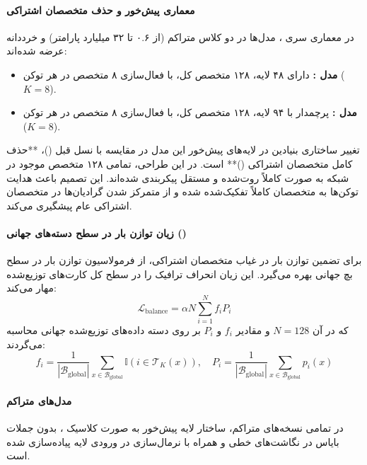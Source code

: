 \item {}

\paragraph*{معماری پیش‌خور و حذف متخصصان اشتراکی}
در معماری سری  \cite{qwen2025qwen3}، مدل‌ها در دو کلاس متراکم (از ۰.۶ تا ۳۲ میلیارد پارامتر) و  خرددانه عرضه شده‌اند:
\begin{itemize}
    \item \textbf{مدل :} دارای ۴۸ لایه، ۱۲۸ متخصص کل، با فعال‌سازی ۸ متخصص در هر توکن ($K=8$).
    \item \textbf{مدل :} پرچمدار با ۹۴ لایه، ۱۲۸ متخصص کل، با فعال‌سازی ۸ متخصص در هر توکن ($K=8$).
\end{itemize}
تغییر ساختاری بنیادین در لایه‌های پیش‌خور  این مدل در مقایسه با نسل قبل ()، **حذف کامل متخصصان اشتراکی ()** است. در این طراحی، تمامی ۱۲۸ متخصص موجود در شبکه به صورت کاملاً روت‌شده و مستقل پیکربندی شده‌اند. این تصمیم باعث هدایت توکن‌ها به متخصصان کاملاً تفکیک‌شده شده و از متمرکز شدن گرادیان‌ها در متخصصان اشتراکی عام پیشگیری می‌کند.

\paragraph*{زیان توازن بار در سطح دسته‌های جهانی ()}
برای تضمین توازن بار در غیاب متخصصان اشتراکی،  از فرمولاسیون توازن بار در سطح بچ جهانی \cite{qiu2025demons} بهره می‌گیرد. این زیان انحراف ترافیک را در سطح کل کارت‌های توزیع‌شده مهار می‌کند:
\begin{equation}
    \mathcal{L}_{\text{balance}} = \alpha N \sum_{i=1}^N f_i P_i
\end{equation}
که در آن $N = 128$ و مقادیر $f_i$ و $P_i$ بر روی دسته داده‌های توزیع‌شده جهانی محاسبه می‌گردند:
\begin{equation}
    f_i = \frac{1}{|\mathcal{B}_{\text{global}}|} \sum_{x \in \mathcal{B}_{\text{global}}} \mathbb{I}\left(i \in \mathcal{T}_K(x)\right), \quad P_i = \frac{1}{|\mathcal{B}_{\text{global}}|} \sum_{x \in \mathcal{B}_{\text{global}}} p_i(x)
\end{equation}

\paragraph*{مدل‌های متراکم }
در تمامی نسخه‌های متراکم، ساختار لایه پیش‌خور به صورت کلاسیک ، بدون جملات بایاس در نگاشت‌های خطی و همراه با نرمال‌سازی  در ورودی لایه پیاده‌سازی شده است.

